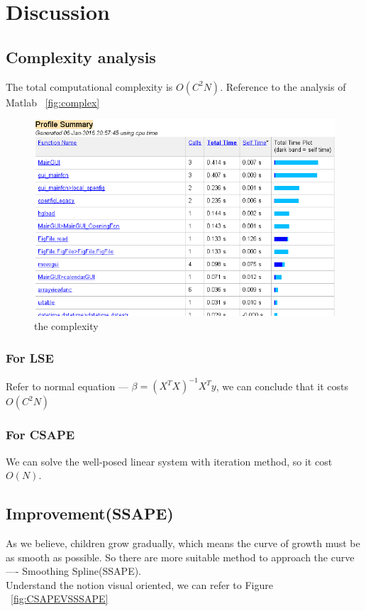 \documentclass[
10pt, %
a4paper, %
oneside, %
headinclude,footinclude, %
BCOR5mm, %
]{scrartcl}
\begin{document}
\section{Discussion}

\subsection{Complexity analysis}
The total computational complexity is $O(C^2N)$. Reference to the analysis of Matlab ~\vref{fig:complex}
\begin{figure}[tb]
\centering
\includegraphics[width=0.5\columnwidth]{./fig/complex.png}
\caption[the complexity]{the complexity}
\label{fig:complex}
\end{figure}
\subsubsection{For LSE}
Refer to normal equation --- $\beta=(X^TX)^{-1}X^Ty$, we can conclude that it costs $O(C^2N)$
\subsubsection{For CSAPE}
We can solve the well-posed linear system with iteration method, so it cost $O(N)$.

\subsection{Improvement(SSAPE)}
As we believe, children grow gradually, which means the curve of growth must be as smooth as possible. So there are more suitable method to approach the curve ---- Smoothing Spline(SSAPE).\\
Understand the notion visual oriented, we can refer to Figure ~\vref{fig:CSAPEVSSSAPE}
\end{document}
